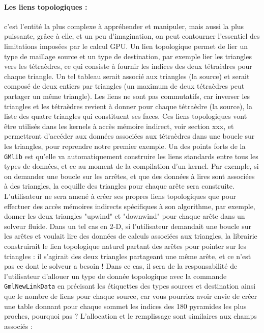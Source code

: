 \documentclass[a4paper,12pt]{article}
\begin{document}
\paragraph{Les liens topologiques : } c'est l'entité la plus complexe à appréhender et manipuler, mais aussi la plus puissante, grâce à elle, et un peu d'imagination, on peut contourner l'essentiel des limitations imposées par le calcul GPU.
Un lien topologique permet de lier un type de maillage source et un type de destination, par exemple lier les triangles vers les tétraèdres, ce qui consiste à fournir les indices des deux tétraèdres pour chaque triangle. Un tel tableau serait associé aux triangles (la source) et serait composé de deux entiers par triangles (un maximum de deux tétraèdres peut partager un même triangle). Les liens ne sont pas commutatifs, car inverser les triangles et les tétraèdres revient à donner pour chaque tétraèdre (la source), la liste des quatre triangles qui constituent ses faces.
Ces liens topologiques vont être utilisés dans les kernels à accès mémoire indirect, voir section xxx, et permettront d'accéder aux données associées aux tétraèdres dans une boucle sur les triangles, pour reprendre notre premier exemple.
Un des points forts de la {\tt GMlib} est qu'elle va automatiquement construire les liens standards entre tous les types de données, et ce au moment de la compilation d'un kernel. Par exemple, si on demander une boucle sur les arrêtes, et que des données à lires sont associées à des triangles, la coquille des triangles pour chaque arête sera construite.
L'utilisateur ne sera amené à créer ses propres liens topologiques que pour effectuer des accès mémoires indirects spécifiques à son algorithme, par exemple, donner les deux triangles "upwind" et "downwind" pour chaque arête dans un solveur fluide. Dans un tel cas en 2-D, si l'utilisateur demandait une boucle sur les arêtes et voulait lire des données de calculs associées aux triangles, la librairie construirait le lien topologique naturel partant des arêtes pour pointer sur les triangles : il s'agirait des deux triangles partageant une même arête, et ce n'est pas ce dont le solveur a besoin !
Dans ce cas, il sera de la responsabilité de l'utilisateur d'allouer un type de donnée topologique avec la commande {\tt GmlNewLinkData} en précisant les étiquettes des types sources et destination ainsi que le nombre de liens pour chaque source, car vous pourriez avoir envie de créer une table donnant pour chaque sommet les indices des 180 pyramides les plus proches, pourquoi pas ?
L'allocation et le remplissage sont similaires aux champs associés :
\end{document}
